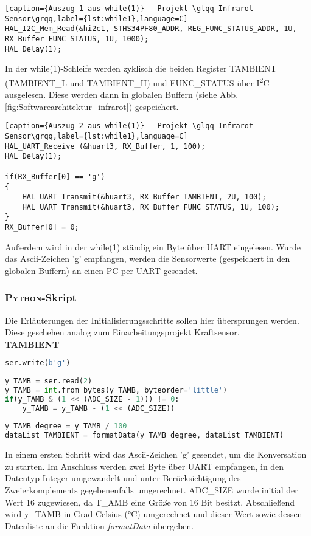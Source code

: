 \documentclass[
	letterpaper, %
	10pt, %
]{CSUniSchoolLabReport}
\begin{document}
\begin{spacing}{1.6}
\begin{lstlisting}[caption={Auszug 1 aus while(1)} - Projekt \glqq Infrarot-Sensor\grqq,label={lst:while1},language=C]
HAL_I2C_Mem_Read(&hi2c1, STHS34PF80_ADDR, REG_FUNC_STATUS_ADDR, 1U, RX_Buffer_FUNC_STATUS, 1U, 1000);
HAL_Delay(1);
\end{lstlisting}
In der while(1)-Schleife werden zyklisch die beiden Register TAMBIENT (TAMBIENT\_L und TAMBIENT\_H) und FUNC\_STATUS über I\textsuperscript{2}C ausgelesen. Diese werden dann in globalen Buffern (siehe Abb. \ref{fig:Softwarearchitektur_infrarot}) gespeichert.\\

\begin{lstlisting}[caption={Auszug 2 aus while(1)} - Projekt \glqq Infrarot-Sensor\grqq,label={lst:while1},language=C]
HAL_UART_Receive (&huart3, RX_Buffer, 1, 100);
HAL_Delay(1);

if(RX_Buffer[0] == 'g')
{
    HAL_UART_Transmit(&huart3, RX_Buffer_TAMBIENT, 2U, 100);
    HAL_UART_Transmit(&huart3, RX_Buffer_FUNC_STATUS, 1U, 100);
}
RX_Buffer[0] = 0;
\end{lstlisting}
Außerdem wird in der while(1) ständig ein Byte über UART eingelesen. Wurde das Ascii-Zeichen 'g' empfangen, werden die Sensorwerte (gespeichert in den globalen Buffern) an einen PC per UART gesendet.\\

\subsubsection{\textsc{Python}-Skript}
Die Erläuterungen der Initialisierungsschritte sollen hier übersprungen werden. Diese geschehen analog zum Einarbeitungsprojekt \glqq Kraftsensor\grqq.\\

\textbf{TAMBIENT}
\begin{lstlisting}[caption={Einlesen von TAMBIENT über UART und Aufrufen der Funktion \textit{formatData} im \textsc{Python}-Skript - Projekt \glqq Infrarot-Sensor\grqq},label={lst:while1},language=python]
ser.write(b'g')
     
y_TAMB = ser.read(2)
y_TAMB = int.from_bytes(y_TAMB, byteorder='little')
if(y_TAMB & (1 << (ADC_SIZE - 1))) != 0:
    y_TAMB = y_TAMB - (1 << (ADC_SIZE))
        
y_TAMB_degree = y_TAMB / 100
dataList_TAMBIENT = formatData(y_TAMB_degree, dataList_TAMBIENT)
\end{lstlisting}
In einem ersten Schritt wird das Ascii-Zeichen 'g' gesendet, um die \glqq Konversation\grqq $ $ zu starten. Im Anschluss werden zwei Byte über UART empfangen, in den Datentyp Integer umgewandelt und unter Berücksichtigung des Zweierkomplements gegebenenfalls umgerechnet. ADC\_SIZE wurde initial der Wert 16 zugewiesen, da T\_AMB eine Größe von 16 Bit besitzt. Abschließend wird y\_TAMB in Grad Celsius (°C) umgerechnet und dieser Wert sowie dessen Datenliste an die Funktion \textit{formatData} übergeben.


\end{spacing}
\end{document}
